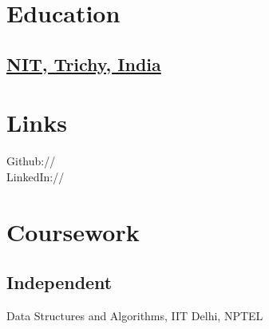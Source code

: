 \documentclass[]{deedy-resume-openfont}
\begin{document}
%
%
\lastupdated

%
%



%
%

\begin{minipage}[t]{0.33\textwidth} 


\section{Education} 

\subsection {\href{http://www.nitt.edu/}{NIT, Trichy, India}}


\section{Links} 
Github:// \href{https://github.com/tushar-rishav}{} \\
LinkedIn://  \href{https://www.linkedin.com/in/tusharrishav}{}
\sectionsep


\section{Coursework} 
\subsection{Independent}
Data Structures and Algorithms, IIT Delhi, NPTEL\\
\sectionsep


\end{minipage}
\end{document}
